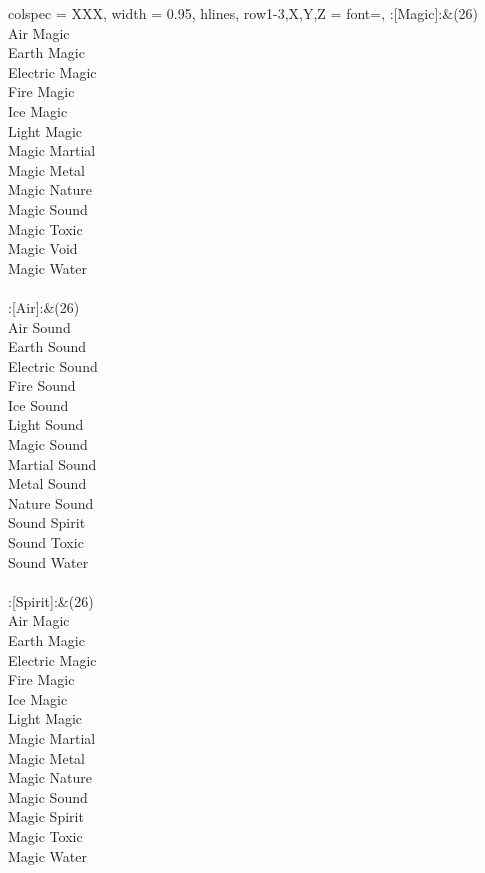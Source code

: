\begin{longtblr}[
	caption = {1v2 Attacking Ineffective},
	label = {1v2-Attacking-Ineffective},
]{
	colspec = {XXX}, width = 0.95\linewidth,
	hlines,
	row{1-3,X,Y,Z} = {font=\bfseries},
}
	:[Magic]:&{(26)\\
	Air Magic \\
	Earth Magic \\
	Electric Magic \\
	Fire Magic \\
	Ice Magic \\
	Light Magic \\
	Magic Martial \\
	Magic Metal \\
	Magic Nature \\
	Magic Sound \\
	Magic Toxic \\
	Magic Void \\
	Magic Water \\
	}\\

	:[Air]:&{(26)\\
	Air Sound \\
	Earth Sound \\
	Electric Sound \\
	Fire Sound \\
	Ice Sound \\
	Light Sound \\
	Magic Sound \\
	Martial Sound \\
	Metal Sound \\
	Nature Sound \\
	Sound Spirit \\
	Sound Toxic \\
	Sound Water \\
	}\\

	:[Spirit]:&{(26)\\
	Air Magic \\
	Earth Magic \\
	Electric Magic \\
	Fire Magic \\
	Ice Magic \\
	Light Magic \\
	Magic Martial \\
	Magic Metal \\
	Magic Nature \\
	Magic Sound \\
	Magic Spirit \\
	Magic Toxic \\
	Magic Water \\
	}\\

\end{longtblr}
\onecolumn
